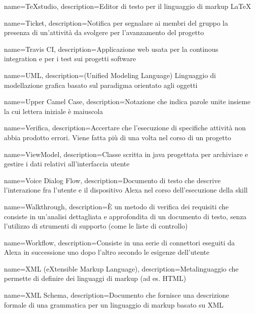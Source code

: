 {
	name={TeXstudio},
	description={Editor di testo per il linguaggio di markup \LaTeX}
}

{
	name={Ticket},
	description={Notifica per segnalare ai membri del gruppo la presenza di un’attività da svolgere per l’avanzamento del progetto}
}

{
	name={Travis CI},
	description={Applicazione web usata per la continous integration e per i test sui progetti software}
	{\newpage}
}

{
	name={UML},
	description={(Unified Modeling Language) Linguaggio di modellazione grafica basato sul paradigma orientato agli oggetti}
}

{
	name={Upper Camel Case},
	description={Notazione che indica parole unite insieme la cui lettera iniziale è maiuscola}
	{\newpage}
}

{
	name={Verifica},
	description={Accertare che l’esecuzione di specifiche attività non abbia prodotto errori. Viene fatta più di una volta nel corso di un progetto}
}

{
	name={ViewModel},
	description={Classe scritta in java progettata per archiviare e gestire i dati relativi all'interfaccia utente}
}

{
	name={Voice Dialog Flow},
	description={Documento di testo che descrive l'interazione fra l'utente e il dispositivo Alexa nel corso dell'esecuzione della skill}
	{\newpage}
}

{
	name={Walkthrough},
	description={È un metodo di verifica dei requisiti che consiste in un'analisi dettagliata e approfondita di un documento di testo, senza l'utilizzo di strumenti di supporto (come le liste di controllo)}
}

{
	name={Workflow},
	description={Consiste in una serie di connettori eseguiti da Alexa in successione uno dopo l'altro secondo le esigenze dell'utente}
	{\newpage}
}

{
	name={XML (eXtensible Markup Language)},
	description={Metalinguaggio che permette di definire dei linguaggi di markup (ad es. HTML)}
}

{
	name={XML Schema},
	description={Documento che fornisce una descrizione formale di una grammatica per un linguaggio di markup basato su XML}
}